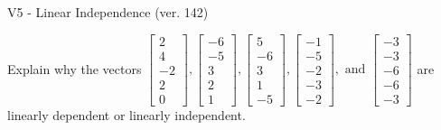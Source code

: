 \begin{exercise}
  \begin{exerciseTitle}V5 - Linear Independence (ver. 142)\end{exerciseTitle}
  \begin{exerciseStatement}
    Explain why the vectors \(\left[\begin{array}{r}
2 \\
4 \\
-2 \\
2 \\
0
\end{array}\right] , \left[\begin{array}{r}
-6 \\
-5 \\
3 \\
2 \\
1
\end{array}\right] , \left[\begin{array}{r}
5 \\
-6 \\
3 \\
1 \\
-5
\end{array}\right] , \left[\begin{array}{r}
-1 \\
-5 \\
-2 \\
-3 \\
-2
\end{array}\right] , \text{ and } \left[\begin{array}{r}
-3 \\
-3 \\
-6 \\
-6 \\
-3
\end{array}\right]\) are linearly dependent or linearly independent.	



\end{exerciseStatement}
\end{exercise}
